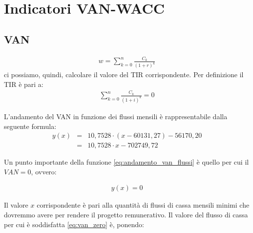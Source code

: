 \chapter[Indicatori VAN-WACC]{Indicatori VAN-WACC}
\section[VAN]{VAN}
	\begin{equation}
	\label{eq:van}
	\begin{split}
 		w = \sum_{k=0}^n \frac{C_k}{(1+r)^k}
	\end{split}
	\end{equation}
	ci possiamo, quindi, calcolare il valore del \ac{TIR} corrispondente. Per definizione il \ac{TIR} è pari a:
	\begin{equation}
	\label{eq:tir}
	\begin{split}
 		\sum_{k=0}^n \frac{C_k}{(1+i)^k} = 0
	\end{split}
	\end{equation}	 

	L'andamento del \ac{VAN} in funzione dei flussi mensili è rappresentabile dalla seguente formula:	
	\begin{eqnarray}
	\label{eq:andamento_van_flussi}
 		y(x) & = & 10,7528 \cdot ( x - 60131,27 ) - 56170,20		\nonumber \\
 			 & = & 10,7528 \cdot x - 702749,72
	\end{eqnarray}


Un punto importante della funzione \ref{eq:andamento_van_flussi} è quello per cui il $ VAN = 0 $, ovvero:

	\begin{equation}
	\label{eq:van_zero}
	\begin{split}
 		y(x) = 0
 	\end{split}
	\end{equation}

Il valore $x$ corrispondente è pari alla quantità di flussi di cassa mensili minimi che dovremmo avere per rendere il progetto remunerativo. Il valore del flusso di cassa per cui è soddisfatta \ref{eq:van_zero} è, ponendo:
			

